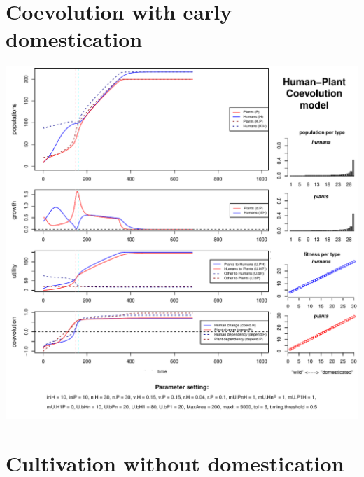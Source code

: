\documentclass[]{book}
\begin{document}
\newpage

\hypertarget{coevolution-with-early-domestication}{%
\section{Coevolution with early domestication}\label{coevolution-with-early-domestication}}

\includegraphics{hpcModel-exploration_files/figure-latex/1_run.coevo.early.dom-plot-1.pdf}

\newpage

\hypertarget{cultivation-without-domestication}{%
\section{Cultivation without domestication}\label{cultivation-without-domestication}}
\end{document}
